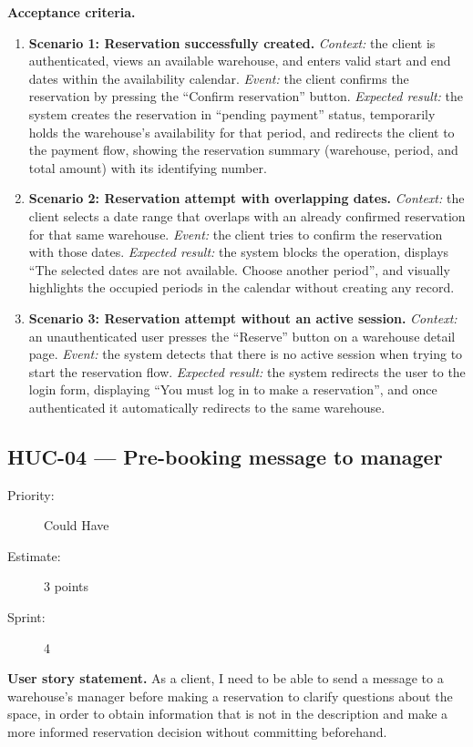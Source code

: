 \documentclass[11pt,a4paper,oneside]{report}
\begin{document}
\textbf{Acceptance criteria.}
\begin{enumerate}
\item \textbf{Scenario 1: Reservation successfully created.} \emph{Context:} the client is authenticated, views an available warehouse, and enters valid start and end dates within the availability calendar. \emph{Event:} the client confirms the reservation by pressing the ``Confirm reservation'' button. \emph{Expected result:} the system creates the reservation in ``pending payment'' status, temporarily holds the warehouse's availability for that period, and redirects the client to the payment flow, showing the reservation summary (warehouse, period, and total amount) with its identifying number.
\item \textbf{Scenario 2: Reservation attempt with overlapping dates.} \emph{Context:} the client selects a date range that overlaps with an already confirmed reservation for that same warehouse. \emph{Event:} the client tries to confirm the reservation with those dates. \emph{Expected result:} the system blocks the operation, displays ``The selected dates are not available. Choose another period'', and visually highlights the occupied periods in the calendar without creating any record.
\item \textbf{Scenario 3: Reservation attempt without an active session.} \emph{Context:} an unauthenticated user presses the ``Reserve'' button on a warehouse detail page. \emph{Event:} the system detects that there is no active session when trying to start the reservation flow. \emph{Expected result:} the system redirects the user to the login form, displaying ``You must log in to make a reservation'', and once authenticated it automatically redirects to the same warehouse.
\end{enumerate}

\subsection{HUC-04 --- Pre-booking message to manager}
\label{req:HUC-04}
\begin{description}
\item[Priority:] Could Have \quad \item[Estimate:] 3 points \quad \item[Sprint:] 4
\end{description}

\textbf{User story statement.} As a client, I need to be able to send a message to a warehouse's manager before making a reservation to clarify questions about the space, in order to obtain information that is not in the description and make a more informed reservation decision without committing beforehand.
\end{document}
